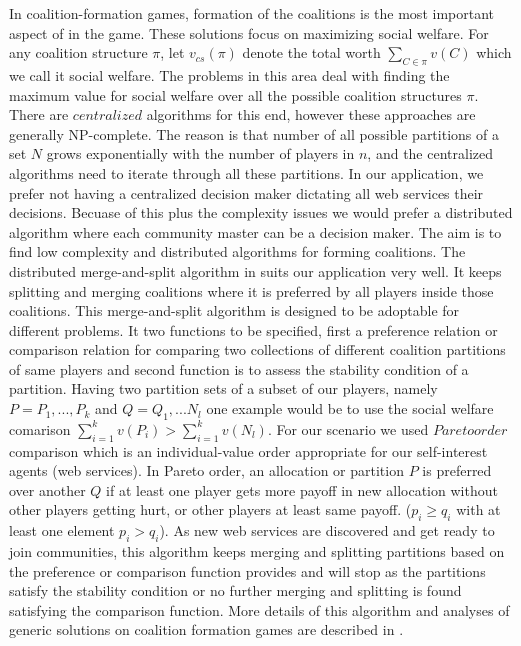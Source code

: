 \documentclass[10pt, conference, compsocconf]{IEEEtran}
\theoremstyle{plain}
\theoremstyle{definition}
\begin{document}
In coalition-formation games, formation of the coalitions is the most important aspect of in the game. These solutions focus on maximizing social welfare. For any coalition structure $\pi$, let $v_{cs}(\pi)$ denote the total worth $\sum_{C \in \pi}{v(C)}$ which we call it social welfare. The problems in this area deal with finding the maximum value for social welfare over all the possible coalition structures $\pi$. There are $centralized$ algorithms for this end, however these approaches are generally NP-complete. The reason is that number of all possible partitions of a set $N$ grows exponentially with the number of players in $n$, and the centralized algorithms need to iterate through all these partitions. 
In our application, we prefer not having a centralized decision maker dictating all web services their decisions. Becuase of this plus the complexity issues we would prefer a distributed algorithm where each community master can be a decision maker. The aim is to find low complexity and distributed algorithms for forming coalitions\cite{DBLP:journals/igtr/AptW09,Dieckmann02dynamiccoalition,ray2007game}. The distributed merge-and-split algorithm in \cite{DBLP:journals/igtr/AptW09} suits our application very well. It keeps splitting and merging coalitions where it is preferred by all players inside those coalitions. 
This merge-and-split algorithm is designed to be adoptable for different problems. It two functions to be specified, first a preference relation or comparison relation for comparing two collections of different coalition partitions of same players and second function is to assess the stability condition of a partition. Having two partition sets of a subset of our players, namely $P = {P_1,...,P_k}$ and $Q = {Q_1,...N_l}$ one example would be to use the social welfare comarison $\sum^k_{i=1}v(P_i) > \sum^k_{i=1}v(N_l)$. For our scenario we used $Pareto order$ comparison which is an individual-value order appropriate for our self-interest agents (web services). In Pareto order, an allocation or partition $P$ is preferred over another $Q$ if at least one player gets more payoff in new allocation without other players getting hurt, or other players at least same payoff. ($p_i \geq q_i$ with at least one element $p_i > q_i$). As new web services are discovered and get ready to join communities, this algorithm keeps merging and splitting partitions based on the preference or comparison function provides and will stop as the partitions satisfy the stability condition or no further merging and splitting is found satisfying the comparison function. More details of this algorithm and analyses of generic solutions on coalition formation games are described in \cite{DBLP:journals/igtr/AptW09}.
\end{document}
